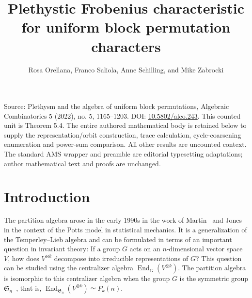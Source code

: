 \documentclass[10pt]{amsart}
\title[Human proof corpus 1380]{Plethystic Frobenius characteristic for uniform block permutation characters}
\author{Rosa Orellana, Franco Saliola, Anne Schilling, and Mike Zabrocki}
\theoremstyle{definition}
\theoremstyle{remark}
\begin{document}
\maketitle
\noindent Source: Plethysm and the algebra of uniform block permutations, Algebraic Combinatorics 5 (2022), no. 5, 1165--1203. DOI: \href{https://doi.org/10.5802/alco.243}{10.5802/alco.243}. This counted unit is Theorem 5.4. The entire authored mathematical body is retained below to supply the representation/orbit construction, trace calculation, cycle-coarsening enumeration and power-sum comparison. All other results are uncounted context. The standard AMS wrapper and preamble are editorial typesetting adaptations; author mathematical text and proofs are unchanged.

\section{Introduction}
\label{Introduction}

The partition algebra arose in the early 1990s in the work of Martin~\cite{Martin.1991,Martin.1994, Martin.1996, Martin.2000} and Jones~\cite{Jones.1994}
in the context of the Potts model in statistical mechanics. It is a generalization of the Temperley--Lieb algebra and can be formulated
in terms of an important question in invariant theory: If a group $G$ acts on an $n$-dimensional vector space $V$, how does $V^{\otimes k}$
decompose into irreducible representations of $G$? This question can be studied using the centralizer algebra $\operatorname{End}_G(V^{\otimes k})$.
The partition algebra is isomorphic to this centralizer algebra when the group $G$ is the symmetric group $\mathfrak{S}_n$~\cite{Jones.1994,Martin.1994}, that is, $\operatorname{End}_{\mathfrak{S}_n}(V^{\otimes k}) \simeq P_k(n)$.
\end{document}
